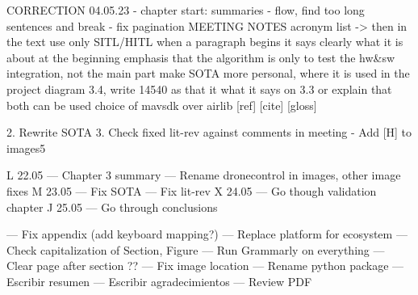 CORRECTION 04.05.23
 - chapter start: summaries
 - flow, find too long sentences and break
 - fix pagination
 MEETING NOTES
 acronym list -> then in the text use only SITL/HITL
when a paragraph begins it says clearly what it is about at the beginning
emphasis that the algorithm is only to test the hw&sw integration, not the main part
make SOTA more personal, where it is used in the project
diagram 3.4, write 14540 as that it what it says on 3.3 or explain that both can be used
choice of mavsdk over airlib
[ref] [cite] [gloss]


2. Rewrite SOTA
3. Check fixed lit-rev against comments in meeting
- Add [H] to images5


L 22.05 --- Chapter 3 summary
        --- Rename dronecontrol in images, other image fixes
M 23.05 --- Fix SOTA
        --- Fix lit-rev
X 24.05 --- Go though validation chapter
J 25.05 --- Go through conclusions

        --- Fix appendix (add keyboard mapping?)
        --- Replace platform for ecosystem
        --- Check capitalization of Section, Figure
        --- Run Grammarly on everything
        --- Clear page after section ??
        --- Fix image location
        --- Rename python package
        --- Escribir resumen
        --- Escribir agradecimientos
        --- Review PDF